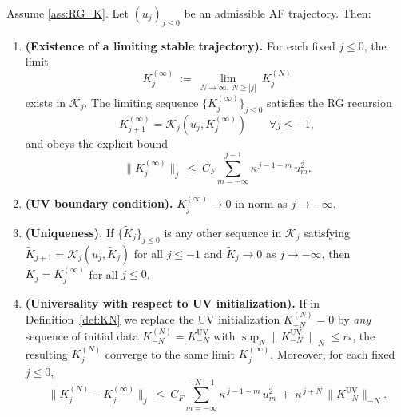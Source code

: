\begin{theorem}\label{thm:stable}
Assume \ref{ass:RG_K}. Let $(u_j)_{j\le 0}$ be an admissible AF trajectory.
Then:
\begin{enumerate}[label=(\alph*)]
\item \textbf{(Existence of a limiting stable trajectory).}
For each fixed $j\le 0$, the limit
\[
K^{(\infty)}_j\ :=\ \lim_{N\to\infty,\ N\ge |j|}\ K^{(N)}_j
\]
exists in $\mathscr K_j$.
The limiting sequence $\{K^{(\infty)}_j\}_{j\le 0}$ satisfies the RG recursion
\[
K^{(\infty)}_{j+1}=\mathcal K_j(u_j,K^{(\infty)}_j)\qquad \forall j\le -1,
\]
and obeys the explicit bound
\begin{equation}\label{eq:Kinf_bound}
\|K^{(\infty)}_j\|_j\ \le\ C_F\sum_{m=-\infty}^{j-1}\kappa^{\,j-1-m}\,u_m^2.
\end{equation}

\item \textbf{(UV boundary condition).}
$K^{(\infty)}_j\to 0$ in norm as $j\to -\infty$.

\item \textbf{(Uniqueness).}
If $\{\widetilde K_j\}_{j\le 0}$ is any other sequence in $\mathscr K_j$ satisfying
$\widetilde K_{j+1}=\mathcal K_j(u_j,\widetilde K_j)$ for all $j\le -1$ and $\widetilde K_j\to 0$ as $j\to -\infty$,
then $\widetilde K_j=K^{(\infty)}_j$ for all $j\le 0$.

\item \textbf{(Universality with respect to UV initialization).}
If in Definition~\ref{def:KN} we replace the UV initialization $K^{(N)}_{-N}=0$ by \emph{any} sequence of initial data
$K^{(N)}_{-N}=K^{\mathrm{UV}}_{-N}$ with $\sup_N\|K^{\mathrm{UV}}_{-N}\|_{-N}\le r_\ast$, the resulting $K^{(N)}_j$ converge to the same limit $K^{(\infty)}_j$.
Moreover, for each fixed $j\le 0$,
\begin{equation}\label{eq:UV_rate}
\|K^{(N)}_j-K^{(\infty)}_j\|_j\ \le\ C_F\sum_{m=-\infty}^{-N-1}\kappa^{\,j-1-m}\,u_m^2\ +\ \kappa^{\,j+N}\,\|K^{\mathrm{UV}}_{-N}\|_{-N}.
\end{equation}
\end{enumerate}
\end{theorem}

